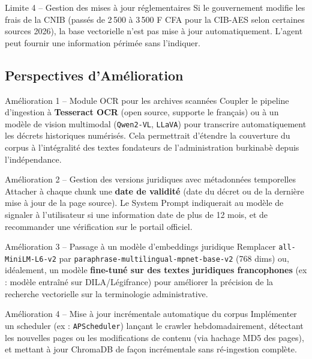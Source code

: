 \documentclass[12pt, a4paper]{article}
\begin{document}
\begin{warnbox}{Limite 4 – Gestion des mises à jour réglementaires}
Si le gouvernement modifie les frais de la CNIB (passés de 2\,500 à 3\,500 F CFA pour la CIB-AES selon certaines sources 2026), la base vectorielle n'est pas mise à jour automatiquement. L'agent peut fournir une information périmée sans l'indiquer.
\end{warnbox}

\subsection{Perspectives d'Amélioration}

\begin{infobox}{Amélioration 1 – Module OCR pour les archives scannées}
Coupler le pipeline d'ingestion à \textbf{Tesseract OCR} (open source, supporte le français) ou à un modèle de vision multimodal (\texttt{Qwen2-VL}, \texttt{LLaVA}) pour transcrire automatiquement les décrets historiques numérisés. Cela permettrait d'étendre la couverture du corpus à l'intégralité des textes fondateurs de l'administration burkinabè depuis l'indépendance.
\end{infobox}

\begin{infobox}{Amélioration 2 – Gestion des versions juridiques avec métadonnées temporelles}
Attacher à chaque chunk une \textbf{date de validité} (date du décret ou de la dernière mise à jour de la page source). Le System Prompt indiquerait au modèle de signaler à l'utilisateur si une information date de plus de 12 mois, et de recommander une vérification sur le portail officiel.
\end{infobox}

\begin{infobox}{Amélioration 3 – Passage à un modèle d'embeddings juridique}
Remplacer \texttt{all-MiniLM-L6-v2} par \texttt{paraphrase-multilingual-mpnet-base-v2} (768 dims) ou, idéalement, un modèle \textbf{fine-tuné sur des textes juridiques francophones} (ex : modèle entraîné sur DILA/Légifrance) pour améliorer la précision de la recherche vectorielle sur la terminologie administrative.
\end{infobox}

\begin{infobox}{Amélioration 4 – Mise à jour incrémentale automatique du corpus}
Implémenter un scheduler (ex : \texttt{APScheduler}) lançant le crawler hebdomadairement, détectant les nouvelles pages ou les modifications de contenu (via hachage MD5 des pages), et mettant à jour ChromaDB de façon incrémentale sans ré-ingestion complète.
\end{infobox}
\end{document}
